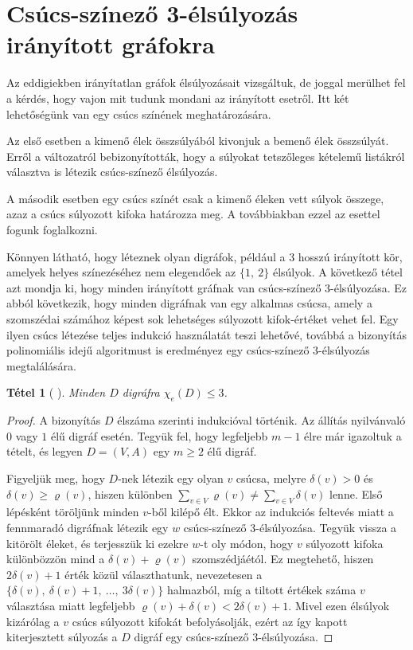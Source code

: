 \documentclass[12pt, a4paper]{report}
\newtheorem{tét}{Tétel}[section]
\theoremstyle{remark}
\theoremstyle{definition}
\begin{document}
\section{Csúcs-színező 3-élsúlyozás irányított gráfokra}
Az eddigiekben irányítatlan gráfok élsúlyozásait vizsgáltuk, de joggal merülhet fel a kérdés, hogy vajon mit tudunk mondani az irányított esetről. Itt két lehetőségünk van egy csúcs színének meghatározására. 

Az első esetben a kimenő élek összsúlyából kivonjuk a bemenő élek összsúlyát. Erről a változatról \citeauthor{Bartnicki2009} \cite{Bartnicki2009} bebizonyították, hogy a súlyokat tetszőleges kételemű listákról választva is létezik csúcs-színező élsúlyozás.

A második esetben egy csúcs színét csak a kimenő éleken vett súlyok összege, azaz a csúcs súlyozott kifoka határozza meg. A továbbiakban ezzel az esettel fogunk foglalkozni.

Könnyen látható, hogy léteznek olyan digráfok, például a $3$ hosszú irányított kör, amelyek helyes színezéséhez nem elegendőek az $\lbrace 1,\ 2 \rbrace$ élsúlyok. A következő tétel azt mondja ki, hogy minden irányított gráfnak van csúcs-színező 3-élsúlyozása. Ez abból következik, hogy minden digráfnak van egy alkalmas csúcsa, amely a szomszédai számához képest sok lehetséges súlyozott kifok-értéket vehet fel. Egy ilyen csúcs létezése teljes indukció használatát teszi lehetővé, továbbá a bizonyítás polinomiális idejű algoritmust is eredményez egy csúcs-színező 3-élsúlyozás megtalálására.

\begin{tét}[\citeauthor{Baudon2014} \cite{Baudon2014}]
Minden $D$ digráfra $\chi_e(D) \leq 3$.
\end{tét}

\begin{proof}
A bizonyítás $D$ élszáma szerinti indukcióval történik. Az állítás nyilvánvaló $0$ vagy $1$ élű digráf esetén. Tegyük fel, hogy legfeljebb $m - 1$ élre már igazoltuk a tételt, és legyen $D = (V, A)$ egy $m \geq 2$ élű digráf.

Figyeljük meg, hogy $D$-nek létezik egy olyan $v$ csúcsa, melyre $\delta(v) > 0$ és $\delta(v) \geq \varrho(v)$, hiszen különben $\sum\limits_{v \in V} \varrho(v) \neq \sum\limits_{v \in V} \delta(v)$ lenne. Első lépésként töröljünk minden $v$-ből kilépő élt. Ekkor az indukciós feltevés miatt a fennmaradó digráfnak létezik egy $w$ csúcs-színező 3-élsúlyozása. Tegyük vissza a kitörölt éleket, és terjesszük ki ezekre $w$-t oly módon, hogy $v$ súlyozott kifoka különbözzön mind a $\delta(v) + \varrho(v)$ szomszédjáétól. Ez megtehető, hiszen $2\delta(v) + 1$ érték közül választhatunk, nevezetesen a $\lbrace \delta(v),\ \delta(v) + 1,\ \ldots,\ 3\delta(v) \rbrace$ halmazból, míg a tiltott értékek száma $v$ választása miatt legfeljebb $\varrho(v) + \delta(v) < 2\delta(v) + 1$. Mivel ezen élsúlyok kizárólag a $v$ csúcs súlyozott kifokát befolyásolják, ezért az így kapott kiterjesztett súlyozás a $D$ digráf egy csúcs-színező 3-élsúlyozása.
\end{proof}
\end{document}

